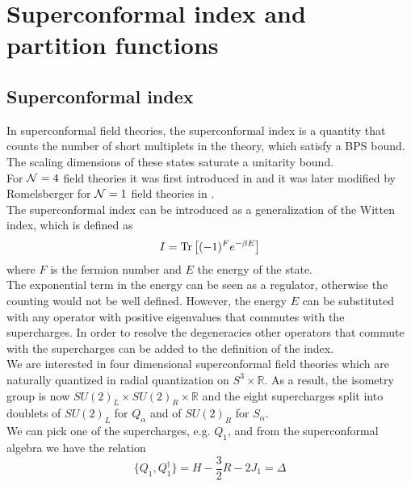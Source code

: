 

\chapter{ \bfseries Superconformal index and  partition functions}



\section{Superconformal index}
In superconformal field theories, the superconformal index is a quantity that counts the number of short multiplets in the theory, which satisfy a BPS bound.
The scaling dimensions of these states saturate a unitarity bound.\\
For $\mathcal{N}=4$ field theories it was first introduced in \cite{Kinney:2005ej}
and it was later modified by Romelsberger for $\mathcal{N}=1$ field theories in \cite{Romelsberger:2005eg}.\\
The superconformal index can be introduced as a generalization of the Witten index, which is defined as 
\begin{equation}
I = \mathrm{Tr } \,{ \left[   (-1)^F e^{-\beta E}\right]}
\end{equation}
where $F$ is the fermion number and $E$ the energy of the state.\\
The exponential term in the energy can be seen as a regulator, otherwise the counting would not be well defined.
However, the energy $E$ can be substituted with any operator with positive eigenvalues that commutes with the supercharges. 
In order to resolve the degeneracies other operators that commute with the supercharges can be added to the definition of the index.
\\
We are interested in four dimensional superconformal field theories which are naturally quantized in radial quantization on $S^3 \times \mathbb{R}$. 
As a result, the isometry group is now $SU(2)_L \times SU(2)_R \times \mathbb{R}$ and the eight supercharges split into doublets of $SU(2)_L$ for $Q_{\alpha}$ and of $SU(2)_R$ for $S_{\alpha}$.\\
We can pick one of the supercharges, e.g. $Q_1$, and from the superconformal algebra we have the relation
\begin{equation}
 \{Q_1, Q_1^{\dagger} \} = H - \frac{3}{2} R - 2 J_1 = \Delta
 \end{equation} 

